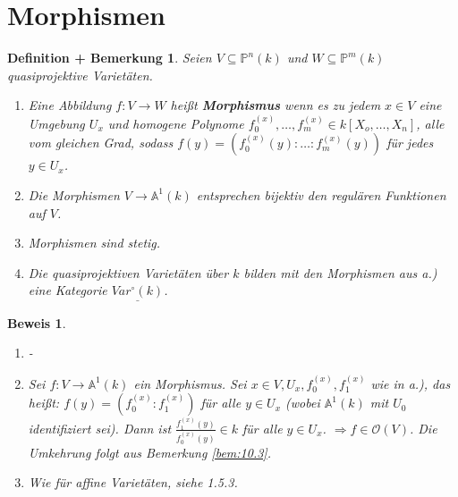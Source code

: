 \documentclass[a4paper,12pt]{report}
\theoremstyle{break}
\newtheorem{DefBem}[Def]{Definition + Bemerkung}
\theoremstyle{nonumberbreak}
\theoremstyle{nonumberplain}
\newtheorem{Bew}{Beweis}
\newcommand{\emp}[1]{\textbf{\emph{#1}}}
\newcommand{\begriff}[1]{{\index{#1}}\emp{#1}}
\begin{document}
\section{Morphismen}
\begin{DefBem}
  \label{defbem:11.1}
  Seien $V\subseteq \mathbb P^n(k)$ und $W\subseteq \mathbb P^m(k)$ quasiprojektive Varietäten.
  \begin{enumerate}
  \item Eine Abbildung $f:V\longrightarrow W$ heißt \begriff{Morphismus} wenn es zu jedem $x\in V$ eine Umgebung $U_x$ und homogene 
    Polynome $f_0^{(x)},\dots,f_m^{(x)}\in k[X_o,\dots,X_n]$, alle vom gleichen Grad, sodass $f(y)=\left(f_0^{(x)}(y):\dots:f_m^{(x)}(y)\right)$
    für jedes $y\in U_x$.
  \item Die Morphismen $V\longrightarrow \mathbb A^1(k)$ entsprechen bijektiv den regulären Funktionen auf $V$.
  \item Morphismen sind stetig.
  \item Die quasiprojektiven Varietäten über $k$ bilden mit den Morphismen aus a.) eine Kategorie $\underline{Var^\circ(k)}$.
  \end{enumerate}
\end{DefBem}
\begin{Bew}
  \begin{enumerate}
  \item -
  \item Sei $f:V\longrightarrow\mathbb A^1(k)$ ein Morphismus. Sei $x\in V, U_x, f_0^{(x)},f_1^{(x)}$ wie in a.), das heißt: 
    $f(y)=\left(f_0^{(x)}:f_1^{(x)}\right)$ für alle $y\in U_x$ (wobei $\mathbb A^1(k)$ mit $U_0$ identifiziert sei).
    Dann ist $\frac{f_1^{(x)}(y)}{f_0^{(x)}(y)}\in k$ für alle $y\in U_x$. $\Rightarrow f\in \mathcal O(V)$. 
    Die Umkehrung folgt aus Bemerkung \ref{bem:10.3}.
  \item Wie für affine Varietäten, siehe 1.5.3.
  \end{enumerate}
\end{Bew}
\end{document}
